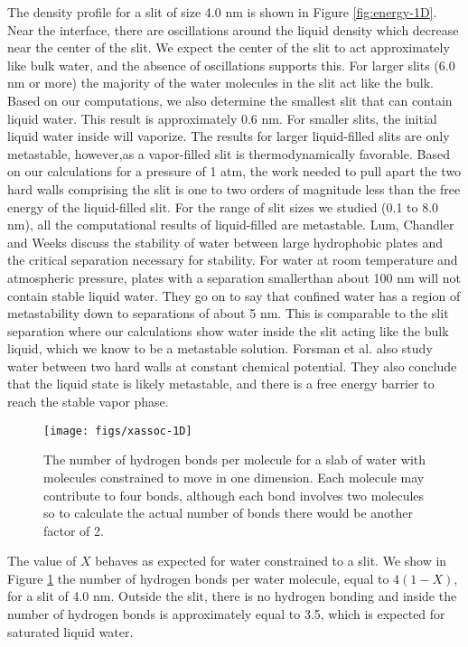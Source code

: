\documentclass[letterpaper,twocolumn,amsmath,amssymb,prb]{revtex4-1}
\begin{document}
The density profile for a slit of size 4.0 nm is shown in Figure
\ref{fig:energy-1D}. Near the interface, there are oscillations around the
liquid density which decrease near the center of the slit. We expect the center
of the slit to act approximately like bulk water, and the absence of
oscillations supports this. For larger slits (6.0 nm or more) the majority of
the water molecules in the slit act like the bulk. Based on our computations, we
also determine the smallest slit that can contain liquid water. This result is
approximately 0.6 nm. For smaller slits, the initial liquid water inside will
vaporize. The results for larger liquid-filled slits are only metastable,
however,as a vapor-filled slit is thermodynamically favorable. Based on our
calculations for a pressure of 1 atm, the work needed to pull apart
the two hard walls comprising the slit is one to two orders of magnitude less
than the free energy of the liquid-filled slit. For the range of slit sizes we
studied (0.1 to 8.0 nm), all the computational results of liquid-filled are
metastable. Lum, Chandler and Weeks \cite{lum1999hydrophobicity} discuss the
stability of water between large hydrophobic plates and the critical separation
necessary for stability. For water at room temperature and atmospheric pressure,
plates with a separation smallerthan about 100 nm will not contain stable liquid
water. They go on to say that confined water has a region of metastability down
to separations of about 5 nm. This is comparable to the slit separation where
our calculations show water inside the slit acting like the bulk liquid, which
we know to be a metastable solution. Forsman et al.\cite{forsman1996computer}
also study water between two hard walls at constant chemical potential. They 
also conclude that the liquid state is likely metastable, and there is a free
energy barrier to reach the stable vapor phase. 

\begin{figure}
\begin{center}
\texttt{[image: figs/xassoc-1D]}
\end{center}
\caption{The number of hydrogen bonds per molecule for a slab of water 
with molecules constrained to move in one dimension. Each molecule may contribute to
four bonds, although each bond involves two molecules so to calculate the actual 
number of bonds there would be another factor of 2.}
\label{fig:xassoc-1D}
\end{figure}

The value of $X$ behaves as expected for water constrained to a slit. We
show in Figure \ref{fig:xassoc-1D} the number of hydrogen bonds per water 
molecule, equal to $4(1-X)$, for a slit of 4.0 nm.
Outside the slit, there is no hydrogen bonding and inside the number of hydrogen
bonds is approximately equal to 3.5, which is expected for saturated liquid water.
\end{document}
